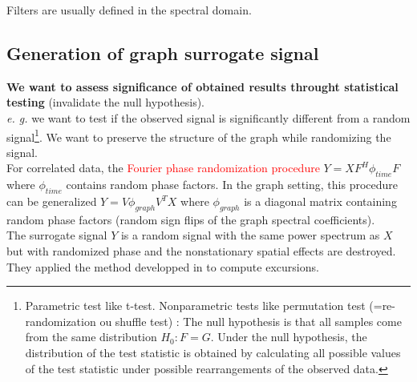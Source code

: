 \documentclass[12pt]{article}
\newcommand{\red}[1]{\textcolor{red}{#1}}
\begin{document}
    Filters are usually defined in the spectral domain. 


\subsection{Generation of graph surrogate signal}
    \textbf{We want to assess significance of obtained results throught statistical testing} (invalidate the null hypothesis). \\ 
    \textit{e. g.} we want to test if the observed signal is significantly different from a random signal\footnote{Parametric test like t-test. Nonparametric tests like permutation test (=re-randomization ou shuffle test) : The null hypothesis is that all samples come from the same distribution $H_{0}:F=G$. Under the null hypothesis, the distribution of the test statistic is obtained by calculating all possible values of the test statistic under possible rearrangements of the observed data.}.
    We want to preserve the structure of the graph while randomizing the signal.\\
    For correlated data, the \red{Fourier phase randomization procedure} $Y = XF^H\phi_{time}F$ where $\phi_{time}$ contains random phase factors. In the graph setting, this procedure can be generalized $Y=V\phi_{graph}V^TX$ where $\phi_{graph}$ is a diagonal matrix containing random phase factors (random sign flips of the graph spectral coefficients).\\
    The surrogate signal $Y$ is a random signal with the same power spectrum as $X$ but with randomized phase and the nonstationary spatial effects are destroyed.\\
    
    They applied the method developped in \cite{pirondini_spectral_2016} to compute excursions. 
\end{document}
